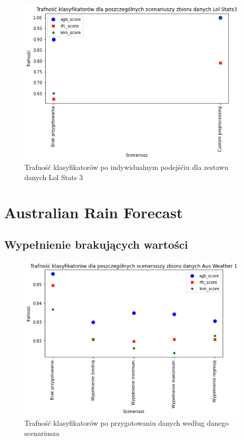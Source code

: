 \documentclass{book}
\begin{document}
\begin{figure}[H]
\centerline{\includegraphics{Lol_Stats_3_Custom}}
\centering
\caption{Trafność klasyfikatorów po indywidualnym podejśćiu dla zestawu danych Lol Stats 3}
\end{figure}



\section{Australian Rain Forecast}


\subsection{Wypełnienie brakujących wartości}
\begin{figure}[H]
\centerline{\includegraphics{Aus_Weather_1_Wypełnienie_brakujących}}
\centering
\caption{Trafność klasyfikatorów po przygotowaniu danych 
według danego scenariusza}
\end{figure}
\end{document}
